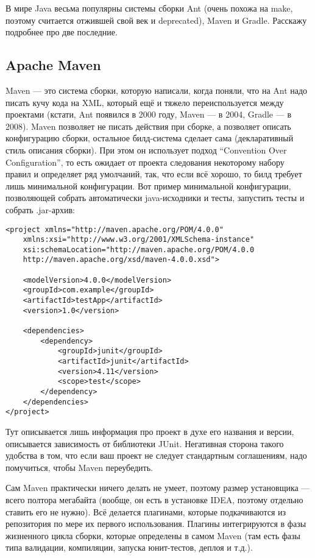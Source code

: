 \documentclass[a5paper]{article}
\begin{document}
В мире Java весьма популярны системы сборки Ant (очень похожа на make, поэтому считается отжившей свой век и deprecated), Maven и Gradle. Расскажу подробнее про две последние.

\subsection{Apache Maven}

Maven --- это система сборки, которую написали, когда поняли, что на Ant надо писать кучу кода на XML, который ещё и тяжело переиспользуется между проектами (кстати, Ant появился в 2000 году, Maven --- в 2004, Gradle --- в 2008). Maven позволяет не писать действия при сборке, а позволяет описать конфигурацию сборки, остальное билд-система сделает сама (декларативный стиль описания сборки). При этом он использует подход ``Convention Over Configuration'', то есть ожидает от проекта следования некоторому набору правил и определяет ряд умолчаний, так, что если всё хорошо, то билд требует лишь минимальной конфигурации. Вот пример минимальной конфигурации, позволяющей собрать автоматически java-исходники и тесты, запустить тесты и собрать .jar-архив:

\begin{verbatim}
<project xmlns="http://maven.apache.org/POM/4.0.0" 
    xmlns:xsi="http://www.w3.org/2001/XMLSchema-instance"
    xsi:schemaLocation="http://maven.apache.org/POM/4.0.0
    http://maven.apache.org/xsd/maven-4.0.0.xsd">

    <modelVersion>4.0.0</modelVersion>
    <groupId>com.example</groupId>
    <artifactId>testApp</artifactId>
    <version>1.0</version>

    <dependencies>
        <dependency>
            <groupId>junit</groupId>
            <artifactId>junit</artifactId>
            <version>4.11</version>
            <scope>test</scope>
        </dependency>
    </dependencies>
</project>
\end{verbatim}

Тут описывается лишь информация про проект в духе его названия и версии, описывается зависимость от библиотеки JUnit. Негативная сторона такого удобства в том, что если ваш проект не следует стандартным соглашениям, надо помучиться, чтобы Maven переубедить.

Сам Maven практически ничего делать не умеет, поэтому размер установщика --- всего полтора мегабайта (вообще, он есть в установке IDEA, поэтому отдельно ставить его не нужно). Всё делается плагинами, которые подкачиваются из репозитория по мере их первого использования. Плагины интегрируются в фазы жизненного цикла сборки, которые определены в самом Maven (там есть фазы типа валидации, компиляции, запуска юнит-тестов, деплоя и т.д.). 
\end{document}
